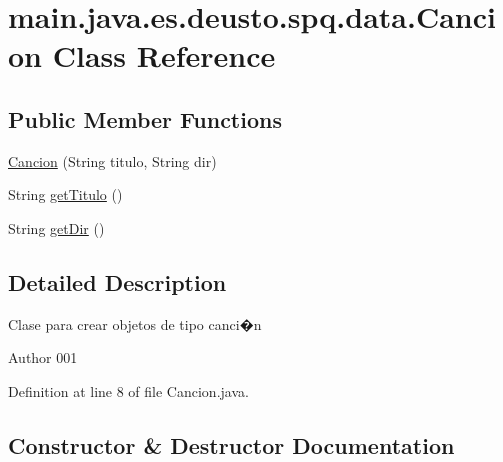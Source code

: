 \hypertarget{classmain_1_1java_1_1es_1_1deusto_1_1spq_1_1data_1_1_cancion}{}\section{main.\+java.\+es.\+deusto.\+spq.\+data.\+Cancion Class Reference}
\label{classmain_1_1java_1_1es_1_1deusto_1_1spq_1_1data_1_1_cancion}
\subsection*{Public Member Functions}
\begin{DoxyCompactItemize}
\item 
\hyperlink{classmain_1_1java_1_1es_1_1deusto_1_1spq_1_1data_1_1_cancion_a378e14b5f95bad5189b50f57ec5ef475}{Cancion} (String titulo, String dir)
\item 
String \hyperlink{classmain_1_1java_1_1es_1_1deusto_1_1spq_1_1data_1_1_cancion_ad3d7b1cfcea3c4c3107feb8082e4bdf5}{get\+Titulo} ()
\item 
String \hyperlink{classmain_1_1java_1_1es_1_1deusto_1_1spq_1_1data_1_1_cancion_a12e64089a8fd660fcea838b96c0cd649}{get\+Dir} ()
\end{DoxyCompactItemize}


\subsection{Detailed Description}
Clase para crear objetos de tipo canci�n \begin{DoxyAuthor}{Author}
001 
\end{DoxyAuthor}


Definition at line 8 of file Cancion.\+java.



\subsection{Constructor \& Destructor Documentation}
